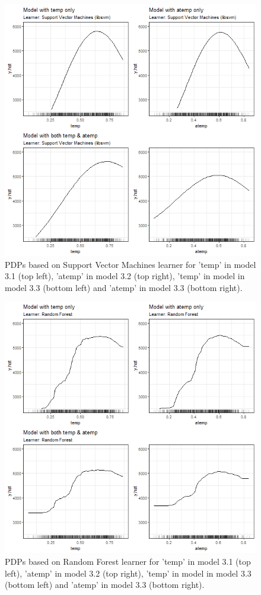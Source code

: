 \documentclass[
]{krantz}
\begin{document}
\begin{figure}

{\centering \includegraphics[width=0.8\linewidth]{images/VK_PDP_5_Correlated_numerical_SVM} 

}

\caption{PDPs based on Support Vector Machines learner for 'temp' in model 3.1 (top left), 'atemp' in model 3.2 (top right), 'temp' in model in model 3.3 (bottom left) and 'atemp' in model 3.3 (bottom right).}\label{fig:Figure05}
\end{figure}

\begin{figure}

{\centering \includegraphics[width=0.8\linewidth]{images/VK_PDP_6_Correlated_numerical_RF} 

}

\caption{PDPs based on Random Forest learner for 'temp' in model 3.1 (top left), 'atemp' in model 3.2 (top right), 'temp' in model in model 3.3 (bottom left) and 'atemp' in model 3.3 (bottom right).}\label{fig:Figure06}
\end{figure}
\end{document}
